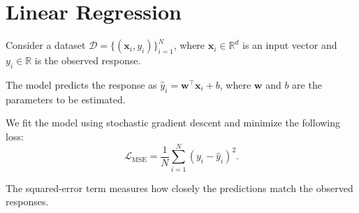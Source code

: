 \documentclass[11pt]{article}
\begin{document}
\section{Linear Regression}

Consider a dataset $\mathcal{D}=\{(\mathbf{x}_i,y_i)\}_{i=1}^{N}$,
where $\mathbf{x}_i \in \mathbb{R}^{d}$ is an input vector and
$y_i \in \mathbb{R}$ is the observed response.

The model predicts the response as
$\hat{y}_i=\mathbf{w}^{\top}\mathbf{x}_i+b$,
where $\mathbf{w}$ and $b$ are the parameters to be estimated.

We fit the model using stochastic gradient descent and minimize
the following loss:
\[
\mathcal{L}_{\mathrm{MSE}}
= \frac{1}{N}\sum_{i=1}^{N}
\left(y_i-\hat{y}_i\right)^2.
\]

The squared-error term measures how closely the predictions match
the observed responses.
\end{document}
